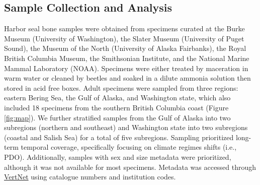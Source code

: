 \documentclass [11pt, proquest] {uwthesis}[2015/03/03]
\begin{document}
\subsection{Sample Collection and
Analysis}\label{sample-collection-and-analysis}

Harbor seal bone samples were obtained from specimens curated at the
Burke Museum (University of Washington), the Slater Museum (University
of Puget Sound), the Museum of the North (University of Alaska
Fairbanks), the Royal British Columbia Museum, the Smithsonian
Institute, and the National Marine Mammal Laboratory (NOAA). Specimens
were either treated by maceration in warm water or cleaned by beetles
and soaked in a dilute ammonia solution then stored in acid free boxes.
Adult specimens were sampled from three regions: eastern Bering Sea, the
Gulf of Alaska, and Washington state, which also included 18 specimens
from the southern British Columbia coast (Figure \ref{fig:map}). We
further stratified samples from the Gulf of Alaska into two subregions
(northern and southeast) and Washington state into two subregions
(coastal and Salish Sea) for a total of five subregions. Sampling
prioritized long-term temporal coverage, specifically focusing on
climate regimes shifts (i.e., PDO). Additionally, samples with sex and
size metadata were prioritized, although it was not available for most
specimens. Metadata was accessed through
\href{http://www.vertnet.org/index.html}{VertNet} using catalogue
numbers and institution codes.
\end{document}
